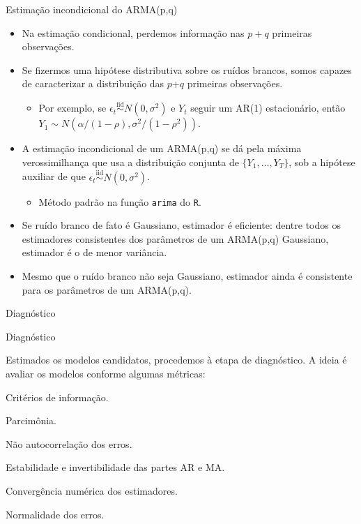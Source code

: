 \documentclass[11pt]{beamer}
\newenvironment{transitionframe}{
	\setbeamercolor{background canvas}{bg=yellow}
	\begin{frame}}{
	\end{frame}
}
\newenvironment{halfwideitemize}{\itemize\addtolength{\itemsep}{0.5em}}{\enditemize}
\newenvironment{halfwideenumerate}{\enumerate\addtolength{\itemsep}{0.5em}}{\endenumerate}
\begin{document}
\begin{frame}{Estimação incondicional do ARMA(p,q)}
	\begin{itemize}
		\item Na estimação condicional, perdemos informação nas $p+q$ primeiras observações.
		\item Se fizermos uma hipótese distributiva sobre os ruídos brancos, somos capazes de caracterizar a distribuição das $p$+$q$ primeiras observações.
		\begin{itemize}
			\item Por exemplo, se $\epsilon_t \overset{\text{iid}}{\sim} N(0,\sigma^2)$ e $Y_t$ seguir um AR(1) estacionário, então $Y_1 \sim N(\alpha/(1-\rho), \sigma^2/(1-\rho^2))$.
		\end{itemize}
		\item A estimação {\color{blue}incondicional} de um ARMA(p,q) se dá pela máxima verossimilhança que usa a distribuição conjunta de $\{Y_1,\ldots, Y_T\}$, sob a hipótese auxiliar de que  $\epsilon_t \overset{\text{iid}}{\sim} N(0,\sigma^2)$.
		\begin{itemize}
			\item Método padrão na função \texttt{arima} do \texttt{R}.
		\end{itemize}
		\item Se ruído branco de fato é Gaussiano, estimador é {\color{blue}eficiente}: dentre todos os estimadores consistentes dos parâmetros de um ARMA(p,q) Gaussiano, estimador é o de menor variância.
		\item Mesmo que o ruído branco não seja Gaussiano, estimador ainda é {\color{blue}consistente} para os parâmetros de um ARMA(p,q).
 	\end{itemize}
\end{frame}

\begin{transitionframe}
	\begin{center}
		{\Huge   Diagnóstico}
	\end{center}
\end{transitionframe}


\begin{frame}{Diagnóstico}
	\begin{halfwideitemize}
		\item Estimados os modelos candidatos, procedemos à etapa de diagnóstico. A ideia é avaliar os modelos conforme algumas métricas:
		\begin{halfwideenumerate}
			\item Critérios de informação.
			\item Parcimônia. 
			\item Não autocorrelação dos erros.
			\item Estabilidade e invertibilidade das partes AR e MA.
			\item Convergência numérica dos estimadores.
			\item Normalidade dos erros.
		\end{halfwideenumerate}
	\end{halfwideitemize}
\end{frame}
\end{document}
